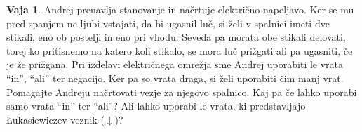 \documentclass{article}
\theoremstyle{definition}
\newtheorem{vaja}{Vaja}
\begin{document}
\begin{vaja}
Andrej prenavlja stanovanje in načrtuje električno napeljavo. Ker se mu pred spanjem ne ljubi vstajati, da bi ugasnil luč, si želi v spalnici imeti dve stikali, eno ob postelji in eno pri vhodu. Seveda pa morata obe stikali delovati, torej ko pritisnemo na katero koli stikalo, se mora luč prižgati ali pa ugasniti, če je že prižgana. Pri izdelavi električnega omrežja sme Andrej uporabiti le vrata ``in'', ``ali'' ter negacijo. Ker pa so vrata draga, si želi uporabiti čim manj vrat. Pomagajte Andreju načrtovati vezje za njegovo spalnico. Kaj pa če lahko uporabi samo vrata ``in'' ter ``ali''? Ali lahko uporabi le vrata, ki predstavljajo Łukasiewiczev veznik ($\downarrow$)?
%

\end{vaja}
\end{document}
